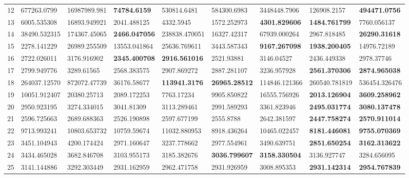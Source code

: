 \begin{table*}[t]
\begin{tabular}{|p{0.8cm}|p{1.6cm}|p{1.6cm}|p{1.6cm}|p{1.6cm}|p{1.6cm}|p{1.6cm}|p{1.6cm}|p{1.6cm}|}
12  & 677263.0799 & 16987989.981 & \textbf{74784.6159} & 530814.6481 & 584300.6983 & 3448448.7906 & 126908.2157 & \textbf{494471.0756} \\ 
13  & 6005.535308 & 16893.949921 & 2041.488125 & 4332.5945 & 1572.252973 & \textbf{4301.829606} & \textbf{1484.761799} & 7760.056137 \\ 
14  & 38490.532315 & 174367.45065 & \textbf{2466.047056} & 238838.470051 & 16327.42317 & 67939.000264 & 2967.818485 & \textbf{26290.31618} \\ 
15  & 2278.141229 & 26989.255509 & 13553.041864 & 25636.769611 & 3443.587343 & \textbf{9167.267098} & \textbf{1938.200405} & 14976.72189 \\ 
16  & 2722.026011 & 3176.916902 & \textbf{2345.400708} & \textbf{2916.561016} & 2521.93881 & 3146.04527 & 2436.449338 & 2978.37746 \\ 
17  & 2799.949776 & 3289.61565 & 2568.383575 & 2907.869272 & 2887.281107 & 3236.957928 & \textbf{2561.370306} & \textbf{2874.965038} \\ 
18  & 264037.12570 & 872072.47739 & 36176.58677 & \textbf{113941.3176} & \textbf{26965.28512} & 114846.121366 & 260540.781819 & 536454.326476 \\ 
19  & 10051.912407 & 20380.25713 & 2089.172253 & 7763.17234 & 9905.850822 & 16555.756926 & \textbf{2013.126904} & \textbf{3609.258962} \\ 
20  & 2950.923195 & 3274.334015 & 3041.81309 & 3113.289461 & 2991.589293 & 3361.823946 & \textbf{2495.031774} & \textbf{3080.137478} \\ 
21  & 2596.725663 & 2689.688363 & 2526.190898 & 2597.677199 & 2555.8788 & 2642.381597 & \textbf{2447.758274} & \textbf{2570.911014} \\ 
22  & 9713.993241 & 10803.653732 & 10759.59674 & 11032.880953 & 8918.436264 & 10465.022457 & \textbf{8181.446081} & \textbf{9755.070369} \\ 
23  & 3451.104943 & 4200.174424 & 2971.160647 & 3237.778662 & 2977.554961 & 3490.639751 & \textbf{2851.650254} & \textbf{3162.313622} \\ 
24  & 3434.465028 & 3682.846708 & 3103.955173 & 3185.382676 & \textbf{3036.799607} & \textbf{3158.330504} & 3136.927747 & 3284.656095 \\ 
25  & 3141.144886 & 3292.303449 & 2931.162959 & 2962.471758 & 2931.926959 & 3008.895353 & \textbf{2931.142314} & \textbf{2954.767839} \\ 

\end{tabular}
\end{table*}

